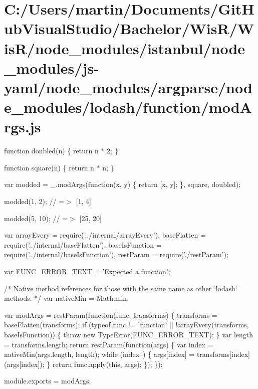 \hypertarget{_c_1_2_users_2martin_2_documents_2_git_hub_visual_studio_2_bachelor_2_wis_r_2_wis_r_2node_module560fe32066c4e4338d291c61724bdd93}{}\section{C\+:/\+Users/martin/\+Documents/\+Git\+Hub\+Visual\+Studio/\+Bachelor/\+Wis\+R/\+Wis\+R/node\+\_\+modules/istanbul/node\+\_\+modules/js-\/yaml/node\+\_\+modules/argparse/node\+\_\+modules/lodash/function/mod\+Args.\+js}
function doubled(n) \{ return n $\ast$ 2; \}

function square(n) \{ return n $\ast$ n; \}

var modded = \+\_\+.\+mod\+Args(function(x, y) \{ return \mbox{[}x, y\mbox{]}; \}, square, doubled);

modded(1, 2); // =$>$ \mbox{[}1, 4\mbox{]}

modded(5, 10); // =$>$ \mbox{[}25, 20\mbox{]}


\begin{DoxyCodeInclude}
var arrayEvery = require(\textcolor{stringliteral}{'../internal/arrayEvery'}),
    baseFlatten = require(\textcolor{stringliteral}{'../internal/baseFlatten'}),
    baseIsFunction = require(\textcolor{stringliteral}{'../internal/baseIsFunction'}),
    restParam = require(\textcolor{stringliteral}{'./restParam'});

var FUNC\_ERROR\_TEXT = \textcolor{stringliteral}{'Expected a function'};

\textcolor{comment}{/* Native method references for those with the same name as other `lodash` methods. */}
var nativeMin = Math.min;

var modArgs = restParam(\textcolor{keyword}{function}(func, transforms) \{
  transforms = baseFlatten(transforms);
  \textcolor{keywordflow}{if} (typeof func != \textcolor{stringliteral}{'function'} || !arrayEvery(transforms, baseIsFunction)) \{
    \textcolor{keywordflow}{throw} \textcolor{keyword}{new} TypeError(FUNC\_ERROR\_TEXT);
  \}
  var length = transforms.length;
  \textcolor{keywordflow}{return} restParam(\textcolor{keyword}{function}(args) \{
    var index = nativeMin(args.length, length);
    \textcolor{keywordflow}{while} (index--) \{
      args[index] = transforms[index](args[index]);
    \}
    \textcolor{keywordflow}{return} func.apply(\textcolor{keyword}{this}, args);
  \});
\});

module.exports = modArgs;
\end{DoxyCodeInclude}
 